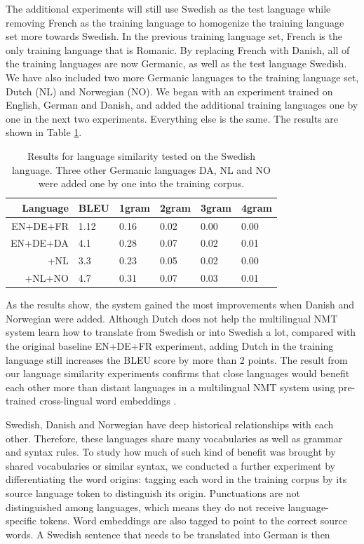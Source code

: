 \documentclass[thesis,fonts=libertine]{cluu}
\begin{document}
The additional experiments will still use Swedish as the test language while removing French as the training language to homogenize the training language set more towards Swedish. In the previous training language set, French is the only training language that is Romanic. By replacing French with Danish, all of the training languages are now Germanic, as well as the test language Swedish. We have also included two more Germanic languages to the training language set, Dutch (NL) and Norwegian (NO). We began with an experiment trained on English, German and Danish, and added the additional training languages one by one in the next two experiments. Everything else is the same. The results are shown in Table \ref{table:language_similarity}.

\begin{table}
  \centering
  \begin{tabular}{r|*{5}{l}}
    \hline
    \textbf{Language} & \textbf{BLEU} & \textbf{1gram} & \textbf{2gram} & \textbf{3gram} & \textbf{4gram} \\ [0.25ex]
    \hline\hline
    EN+DE+FR & 1.12 & 0.16 & 0.02 & 0.00 & 0.00 \\
    \hline
    EN+DE+DA & 4.1 & 0.28 & 0.07 & 0.02 & 0.01 \\
    +NL & 3.3 & 0.23 & 0.05 & 0.02 & 0.00 \\ 
    +NL+NO & 4.7 & 0.31 & 0.07 & 0.03 & 0.01 \\
    \hline
  \end{tabular}
  \caption{Results for language similarity tested on the Swedish language. Three other Germanic languages DA, NL and NO were added one by one into the training corpus.}
  \label{table:language_similarity}
\end{table}

As the results show, the system gained the most improvements when Danish and Norwegian were added. Although Dutch does not help the multilingual NMT system learn how to translate from Swedish or into Swedish a lot, compared with the original baseline EN+DE+FR experiment, adding Dutch in the training language still increases the BLEU score by more than 2 points. The result from our language similarity experiments confirms that close languages would benefit each other more than distant languages in a multilingual NMT system using pre-trained cross-lingual word embeddings \parencite{Qi:2018aa}.

Swedish, Danish and Norwegian have deep historical relationships with each other. Therefore, these languages share many vocabularies as well as grammar and syntax rules. To study how much of such kind of benefit was brought by shared vocabularies or similar syntax, we conducted a further experiment by differentiating the word origins: tagging each word in the training corpus by its source language token to distinguish its origin. Punctuations are not distinguished among languages, which means they do not receive language-specific tokens. Word embeddings are also tagged to point to the correct source words. A Swedish sentence that needs to be translated into German is then
\end{document}
